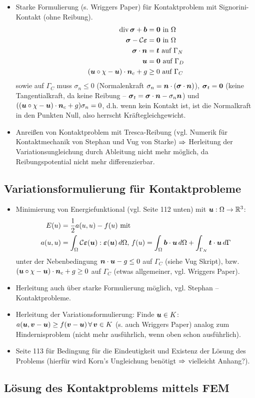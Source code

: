 \begin{itemize}
\item Starke Formulierung (s. Wriggers Paper) für Kontaktproblem mit Signorini-Kontakt (ohne Reibung).
\begin{align}
\operatorname{div} \boldsymbol \sigma + \boldsymbol b &= \boldsymbol 0 \text{ in } \Omega\\
\boldsymbol \sigma  - \mathcal C \boldsymbol {\varepsilon} & = \boldsymbol 0 \text{ in } \Omega\\
\boldsymbol \sigma \cdot \boldsymbol n &= \boldsymbol t  \text{ auf } \Gamma_N \\
\boldsymbol u &= \boldsymbol 0 \text{ auf } \Gamma_D \\
(\boldsymbol u \circ \chi - \boldsymbol u) \cdot \boldsymbol n_c + g& \ge 0 \text{ auf } \Gamma_C
\end{align}
sowie auf $\Gamma_C$ muss $\sigma_n \le 0$ (Normalenkraft $\sigma_n = \boldsymbol n\cdot ( \boldsymbol \sigma \cdot \boldsymbol n)$), $\boldsymbol \sigma_t = \boldsymbol 0$ (keine Tangentialkraft, da keine Reibung – $\boldsymbol \sigma_t = \boldsymbol \sigma \cdot \boldsymbol n - \sigma_n \boldsymbol n$) und $((\boldsymbol u \circ \chi - \boldsymbol u) \cdot \boldsymbol n_c + g)\sigma_n = 0$, d.h. wenn kein Kontakt ist, ist die Normalkraft in den Punkten Null, also herrscht Kräftegleichgewicht.
\item Anreißen von Kontaktproblem mit Tresca-Reibung (vgl. Numerik für Kontaktmechanik von Stephan und Vug von Starke) $\Rightarrow$ Herleitung der Variationsungleichung durch Ableitung nicht mehr möglich, da Reibungspotential nicht mehr differenzierbar.
\end{itemize}

\subsection{Variationsformulierung für Kontaktprobleme}

\begin{itemize}
\item Minimierung von Energiefunktional (vgl. \cite{KikOden} Seite 112 unten) mit $\boldsymbol{u}: \Omega\rightarrow \mathbb{R}^3$:
\begin{align*}
	E(u)& = \frac 1 2 a(u,u)-f(u) \text{ mit } \\
	 a(u,u) &= \int_\Omega {\mathcal C} \boldsymbol{\varepsilon} (\boldsymbol u): \boldsymbol{\varepsilon}(\boldsymbol u) \, d\Omega , \, f(u) = \int_\Omega \boldsymbol b \cdot \boldsymbol u \, d\Omega + \int_{\Gamma_N} \boldsymbol t \cdot \boldsymbol u \, d\Gamma
\end{align*}
unter der Nebenbedingung $\boldsymbol n \cdot \boldsymbol u - g \le 0$ auf $\Gamma_C$  (siehe Vug Skript), bzw. $(\boldsymbol u\circ \chi - \boldsymbol u)\cdot \boldsymbol n_c + g \ge 0$ auf $\Gamma_C$ (etwas allgemeiner, vgl. Wriggers Paper).
\item Herleitung auch über starke Formulierung möglich, vgl. Stephan – Kontaktprobleme.
\item Herleitung der Variationsformulierung: Finde $\boldsymbol u \in K$: $a(\boldsymbol u,\boldsymbol v-\boldsymbol u) \ge f(\boldsymbol v-\boldsymbol u) \, \forall \, \boldsymbol v \in K$ (s. auch Wriggers Paper) analog zum Hindernisproblem (nicht mehr ausführlich, wenn oben schon ausführlich).
\item \cite{KikOden} Seite 113 für Bedingung für die Eindeutigkeit und Existenz der Lösung des Problems (hierfür wird Korn's Ungleichung benötigt $\Rightarrow$ vielleicht Anhang?).
\end{itemize}

\subsection{Lösung des Kontaktproblems mittels FEM}

\newpage

